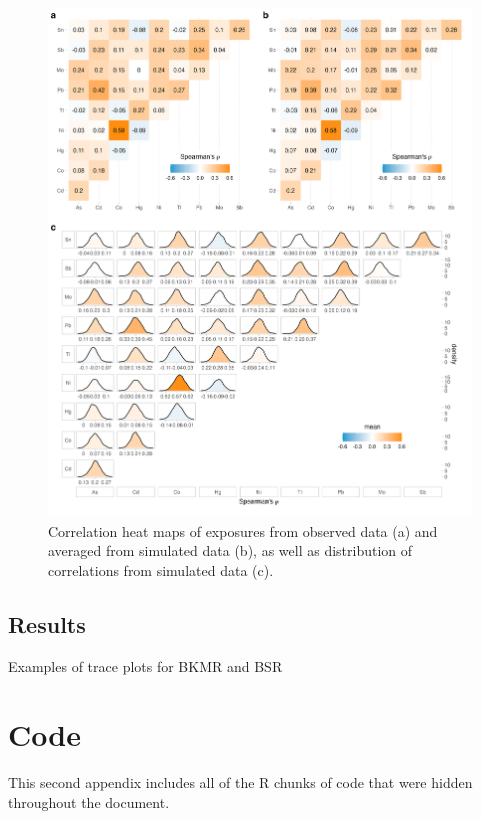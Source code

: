 \documentclass[12pt, twoside]{amherstthesis}
\begin{document}
\begin{figure}

{\centering \includegraphics[width=1\linewidth]{figures/ch4_corr_lg_simorigdens} 

}

\caption{Correlation heat maps of exposures from observed data (a) and averaged from simulated data (b), as well as distribution of correlations from simulated data (c).}\label{fig:corsims}
\end{figure}
\hypertarget{results-1}{%
\section{Results}\label{results-1}}

Examples of trace plots for BKMR and BSR

\hypertarget{code}{%
\chapter{Code}\label{code}}

This second appendix includes all of the R chunks of code that were hidden throughout the document.
\end{document}
